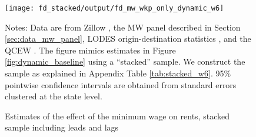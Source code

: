
\begin{figure}[h!]
    \centering
    \caption{Estimates of the effect of the minimum wage on rents, stacked sample including
             leads and lags}
    \label{fig:dynamic_stacked}

    \texttt{[image: fd\_stacked/output/fd\_mw\_wkp\_only\_dynamic\_w6]}

    \begin{minipage}{.95\textwidth} \footnotesize
        \vspace{3mm}
        Notes:
        Data are from Zillow \parencite{ZillowData},
        the MW panel described in Section \ref{sec:data_mw_panel},
        LODES origin-destination statistics \parencite{CensusLODES},
        and the QCEW \parencite{QCEW}.
        The figure mimics estimates in Figure \ref{fig:dynamic_baseline} 
        using a ``stacked'' sample.
        We construct the sample as explained in Appendix Table \ref{tab:stacked_w6}.
        95\% pointwise confidence intervals are obtained from standard errors 
        clustered at the state level.
    \end{minipage}
\end{figure}
